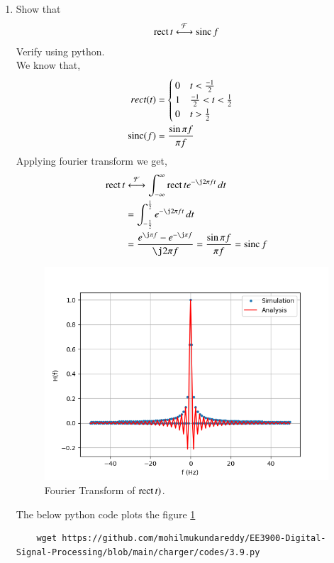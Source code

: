 \documentclass[journal,12pt,twocolumn]{IEEEtran}
\renewcommand\thesection{\arabic{section}}
\begin{document}
\begin{enumerate}[label=\thesection.\arabic*
	,ref=\thesection.\theenumi]
\begin{lstlisting}
	\end{lstlisting} 
%	
	\item Show that
	\begin{align}
		\mathop{\mathrm{rect}}{t} \overset{\mathcal{F}}{ \longleftrightarrow} \mathop{\mathrm{sinc}}{f}
	\end{align}
	Verify using python.\\
	\solution We know that,
	\begin{align}
		rect(t)&=
	\begin{cases}
		0 \quad t<\frac{-1}{2}\\
		1 \quad \frac{-1}{2}<t<\frac{1}{2}\\
		0 \quad t>\frac{1}{2}
	\end{cases}\\
\mathop{\mathrm{sinc}}(f)&=\frac{\sin{\pi f}}{\pi f}
	\end{align}
Applying fourier transform we get,
	\begin{align}
		\rect{t}&\system{F}\int_{-\infty}^{\infty}\rect{t} e^{-\j2\pi ft}\, dt \\
		&=\int_{-\frac{1}{2}}^{\frac{1}{2}}e^{-\j 2\pi ft}\, dt \\
		\label{eq:fourierrect}
		&=\frac{e^{\j\pi f} - e^{-\j\pi f}}{\j2\pi f} = \frac{\sin{\pi f}}{\pi f} = \sinc{f}
	\end{align}
	\begin{figure}[!ht]
	\includegraphics[width=\columnwidth]{figs/3.9.png}
	\caption{Fourier Transform of $\mathop{\mathrm{rect}}{t})$.}
	\label{fig:3.9}
\end{figure}
The below python code plots the figure \ref{fig:3.9}
	\begin{lstlisting}
	wget https://github.com/mohilmukundareddy/EE3900-Digital-Signal-Processing/blob/main/charger/codes/3.9.py
\end{lstlisting} 


\end{enumerate}
\end{document}
